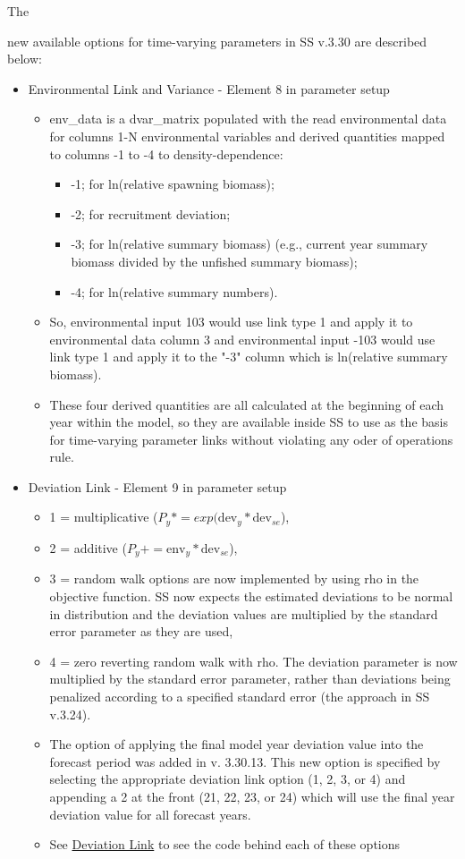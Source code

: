 \hypertarget{EnvVar}{The} new available options for time-varying parameters in SS v.3.30 are described below:
\begin{itemize}
	\item Environmental Link and  Variance - Element 8 in parameter setup
		\begin{itemize}
			\item env\_data is a dvar\_matrix populated with the read environmental data for columns 1-N environmental variables and derived quantities mapped to columns -1 to -4 to density-dependence:
			\begin{itemize}
				\item -1;  for ln(relative spawning biomass);
				\item -2;  for recruitment deviation;
				\item -3;  for ln(relative summary biomass) (e.g., current year summary biomass divided by the unfished summary biomass);
				\item -4;  for ln(relative summary numbers).
			\end{itemize}
			\item So, environmental input 103 would use link type 1 and apply it to environmental data column 3 and environmental input -103  would use link type 1 and apply it to the "-3" column which is ln(relative summary biomass).
			\item These four derived quantities are all calculated at the beginning of each year within the model, so they are available inside SS to use as the basis for time-varying parameter links without violating any oder of operations rule. 
		\end{itemize}
		
	\item Deviation Link - Element 9 in parameter setup
	\begin{itemize}
		\item 1 = multiplicative ($P_y*=exp(\text{dev}_y*\text{dev}_{se}$),
		\item 2 = additive ($P_y+=\text{env}_y*\text{dev}_{se}$),
		\item 3 = random walk options are now implemented by using rho in the objective function. SS now expects the estimated deviations to be normal in distribution and the deviation values are multiplied by the standard error parameter as they are used,
		\item 4 = zero reverting random walk with rho. The deviation parameter is now multiplied by the standard error parameter, rather than deviations being penalized according to a specified standard error (the approach in SS v.3.24).
		\item The option of applying the final model year deviation value into the forecast period was added in v. 3.30.13.  This new option is specified by selecting the appropriate deviation link option (1, 2, 3, or 4) and appending a 2 at the front (21, 22, 23, or 24) which will use the final year deviation value for all forecast years. 
		\item See \hyperlink{DevLink}{Deviation Link} to see the code behind each of these options
	\end{itemize}
	

\end{itemize}
